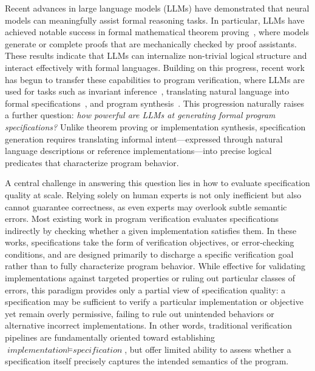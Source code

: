 Recent advances in large language models (LLMs) have demonstrated that neural models can meaningfully assist formal reasoning tasks. In particular, LLMs have achieved notable success in formal mathematical theorem proving~\cite{xin2024deepseek,wang2024lego,xin2025deepseek,ren2025deepseek,chen2025seed,lin2025goedel,wang2025kimina,hubert2025olympiad}, where models generate or complete proofs that are mechanically checked by proof assistants. These results indicate that LLMs can internalize non-trivial logical structure and interact effectively with formal languages. Building on this progress, recent work has begun to transfer these capabilities to program verification, where LLMs are used for tasks such as invariant inference~\cite{kamath2023finding,chakraborty2023ranking,pirzada2024llm,cao2025clause2inv}, translating natural language into formal specifications~\cite{cosler2023nl2spec,endres2024can,cao2025informal,fang2025enhancing}, and program synthesis~\cite{first2023baldur,misu2024towards}. This progression naturally raises a further question: \emph{how powerful are LLMs at generating formal program specifications?} Unlike theorem proving or implementation synthesis, specification generation requires translating informal intent---expressed through natural language descriptions or reference implementations---into precise logical predicates that characterize program behavior.



A central challenge in answering this question lies in how to evaluate specification quality at scale. Relying solely on human experts is not only inefficient but also cannot guarantee correctness, as even experts may overlook subtle semantic errors. Most existing work in program verification evaluates specifications indirectly by checking whether a given implementation satisfies them. In these works, specifications take the form of verification objectives, or error-checking conditions, and are designed primarily to discharge a specific verification goal rather than to fully characterize program behavior. While effective for validating implementations against targeted properties or ruling out particular classes of errors, this paradigm provides only a partial view of specification quality: a specification may be sufficient to verify a particular implementation or objective yet remain overly permissive, failing to rule out unintended behaviors or alternative incorrect implementations. In other words, traditional verification pipelines are fundamentally oriented toward establishing $\textit{implementation} \models \textit{specification}$, but offer limited ability to assess whether a specification itself precisely captures the intended semantics of the program.

